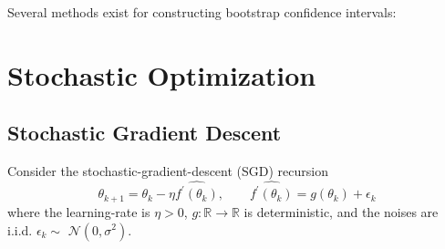\documentclass[10pt, headings=standardclasses, parskip=half, twoside]{scrartcl}
\begin{document}
Several methods exist for constructing bootstrap confidence intervals:




\clearpage
\section{Stochastic Optimization}\label{sec:optimization}

\subsection{Stochastic Gradient Descent}\label{sec:SGD}

Consider the stochastic-gradient-descent (SGD) recursion
$$
\theta_{k+1}=\theta_k-\eta \widehat{f^{\prime}\left(\theta_k\right)}, \qquad \widehat{f^{\prime}\left(\theta_k\right)}=g\left(\theta_k\right)+\epsilon_k
$$
where the learning-rate is $\eta>0$, $g: \mathbb{R} \rightarrow \mathbb{R}$ is deterministic, and the noises are i.i.d. $\epsilon_k \sim$ $\mathcal{N}\left(0, \sigma^2\right)$.


\end{document}
